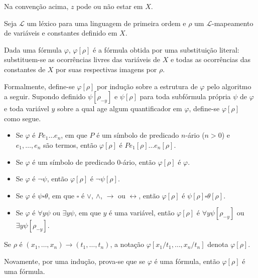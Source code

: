 Na convenção acima, $z$ pode ou não estar em $X$.
\begin{metadefinition}\label{mdef:substituicaoEmFormulas}
    Seja $\mathcal L$ um léxico para uma linguagem de primeira ordem e $\rho$ um $\mathcal L$-mapeamento de variáveis e constantes definido em $X$.

    Dada uma fórmula $\varphi$, $\varphi[\rho]$ é a fórmula obtida por uma substituição literal: substituem-se as ocorrências livres das variáveis de $X$ e todas as ocorrências das constantes de $X$ por suas respectivas imagens por $\rho$.

    Formalmente, define-se $\varphi[\rho]$ por indução sobre a estrutura de $\varphi$ pelo algoritmo a seguir.
    Supondo definido $\psi[\rho_{-y}]$ e  $\psi[\rho]$ para toda subfórmula própria $\psi$ de $\varphi$ e toda variável $y$ sobre a qual age algum quantificador em $\varphi$, define-se $\varphi[\rho]$ como segue.
    \begin{itemize}
        \item Se $\varphi$ é $P e_1 \dots e_n$, em que $P$ é um símbolo de predicado $n$-ário ($n>0$) e $e_1, \dots, e_n$ são termos, então $\varphi[\rho]$ é $P e_1[\rho] \dots e_n[\rho]$.
        \item Se $\varphi$ é um símbolo de predicado 0-ário, então $\varphi[\rho]$ é $\varphi$.
        \item Se $\varphi$ é $\neg \psi$, então $\varphi[\rho]$ é $\neg \psi[\rho]$.
        \item Se $\varphi$ é $\psi \square \theta$, em que $\square$ é $\vee$, $\wedge$, $\rightarrow$ ou $\leftrightarrow$, então $\varphi[\rho]$ é $\psi[\rho] \square \theta[\rho]$.
        \item Se $\varphi$ é $\forall y \psi$ ou $\exists y \psi$, em que $y$ é uma variável, então $\varphi[\rho]$ é $\forall y \psi[\rho_{-y}]$ ou $\exists y \psi[\rho_{-y}]$.
    \end{itemize}

    Se $\rho$ é $(x_1, \dots, x_n)\to (t_1, \dots, t_n)$, a notação $\varphi[x_1/t_1, \dots, x_n/t_n]$ denota $\varphi[\rho]$.
\end{metadefinition}

Novamente, por uma indução, prova-se que se $\varphi$ é uma fórmula, então $\varphi[\rho]$ é uma fórmula.

